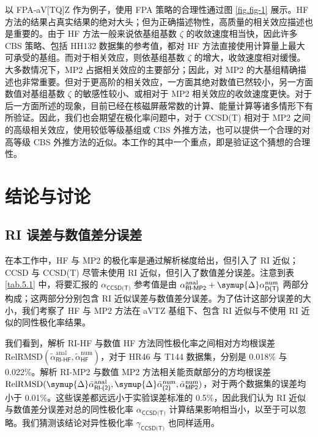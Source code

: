 以 FPA-aV[TQ]Z 作为例子，使用 FPA 策略的合理性通过图 \ref{fig.fig-1} 展示。HF 方法的结果占真实结果的绝对大头；但为正确描述物性，高质量的相关效应描述也是重要的。由于 HF 方法一般来说依基组基数 $\zeta$ 的收敛速度相当快\cite{Jensen-Jensen.TCA.2005, Karton-Martin.TCA.2006}，因此许多 CBS 策略、包括 HH132 数据集的参考值，都对 HF 方法直接使用计算量上最大可承受的基组。而对于相关效应，则依基组基数 $\zeta$ 的增大，收敛速度相对缓慢。大多数情况下，MP2 占据相关效应的主要部分；因此，对 MP2 的大基组精确描述也非常重要。但对于更高阶的相关效应，一方面其绝对数值已然较小，另一方面数值对基组基数 $\zeta$ 的敏感性较小、或相对于 MP2 相关效应的收敛速度更快。对于后一方面所述的现象，目前已经在核磁屏蔽常数的计算\cite{Sun-Xu.JCP.2013, Wang-Xu.JCP.2018, Gregusova-Bartlett.JCTC.2010}、能量计算\cite{Truhlar-Truhlar.CPL.1998}等诸多情形下有所验证。因此，我们也会期望在极化率问题中，对于 CCSD(T) 相对于 MP2 之间的高级相关效应，使用较低等级基组或 CBS 外推方法，也可以提供一个合理的对高等级 CBS 外推方法的近似。本工作的其中一个重点，即是验证这个猜想的合理性。

\section{结论与讨论}

\subsection{RI 误差与数值差分误差}
\label{sec.5.3.1}

在本工作中，HF 与 MP2 的极化率是通过解析梯度给出，但引入了 RI 近似；CCSD 与 CCSD(T) 尽管未使用 RI 近似，但引入了数值差分误差。注意到表 \ref{tab.5.1} 中，将要汇报的 $\alpha_\textsf{CCSD(T)}$ 参考值是由 $\alpha^\text{anal}_\textsf{RI-MP2} + \symup{\Delta} \alpha^\text{num}_\textsf{D(T)}$ 两部分构成；这两部分分别包含 RI 近似误差与数值差分误差。为了估计这部分误差的大小，我们考察了 HF 与 MP2 方法在 aVTZ 基组下、包含 RI 近似与不使用 RI 近似的同性极化率结果。

我们看到，解析 RI-HF 与数值 HF 方法同性极化率之间相对方均根误差 $\text{RelRMSD} (\tilde \alpha_\textsf{RI-HF}^\text{anal}, \tilde \alpha^\text{num}_\textsf{HF})$，对于 HR46 与 T144 数据集，分别是 0.018\% 与 0.022\%。解析 RI-MP2 与数值 MP2 方法相关能贡献部分的方均根误差 $\text{RelRMSD} (\symup{\Delta} \tilde \alpha^\text{anal}_\textsf{RI-(2)}, \allowbreak \symup{\Delta} \tilde \alpha^\text{num}_\textsf{(2)}, \allowbreak \tilde \alpha^\text{num}_\textsf{MP2})$，对于两个数据集的误差均小于 0.01\%。这些误差都远远小于实验误差标准的 0.5\%，因此我们认为 RI 近似与数值差分误差对总的同性极化率 $\alpha_\textsf{CCSD(T)}$ 计算结果影响相当小，以至于可以忽略。我们猜测该结论对异性极化率 $\gamma_\textsf{CCSD(T)}$ 也同样适用。

